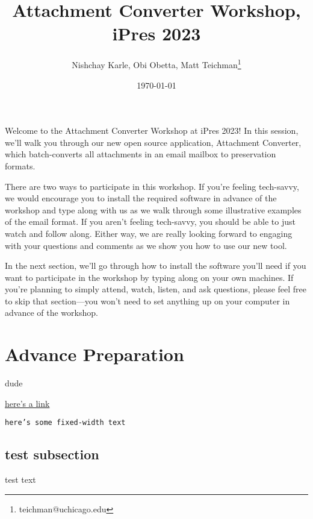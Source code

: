 \documentclass[11pt]{article}
\author{Nishchay Karle, Obi Obetta, Matt Teichman\thanks{teichman@uchicago.edu}}
\date{\today}
\title{Attachment Converter Workshop, iPres 2023}
\begin{document}
\maketitle
Welcome to the Attachment Converter Workshop at iPres 2023!  In this
session, we'll walk you through our new open source application,
Attachment Converter, which batch-converts all attachments in an email
mailbox to preservation formats.

There are two ways to participate in this workshop.  If you're feeling
tech-savvy, we would encourage you to install the required software in
advance of the workshop and type along with us as we walk through some
illustrative examples of the email format.  If you aren't feeling
tech-savvy, you should be able to just watch and follow along.  Either
way, we are really looking forward to engaging with your questions and
comments as we show you how to use our new tool.

In the next section, we'll go through how to install the software
you'll need if you want to participate in the workshop by typing along
on your own machines.  If you're planning to simply attend, watch,
listen, and ask questions, please feel free to skip that section---you
won't need to set anything up on your computer in advance of the
workshop.

\section*{Advance Preparation}
\label{sec:orgcac8abe}

dude

\href{https://gnu.org}{here's a link}

\texttt{here's some fixed-width text}

\subsection*{test subsection}
\label{sec:orgdecc9b7}

test text
\end{document}
